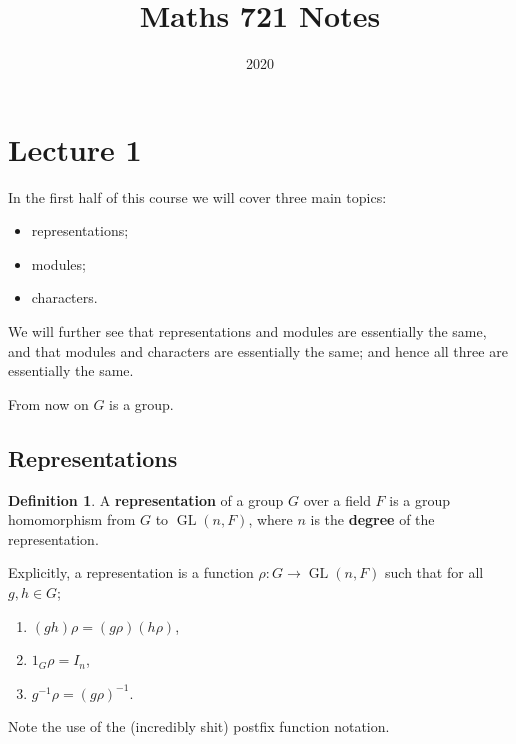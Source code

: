 \documentclass[11pt, notitlepage]{article}
\title{Maths 721 Notes}
\date{2020}
\numberwithin{equation}{section}
\theoremstyle{plain}
\theoremstyle{definition}
\newtheorem{definition}[theorem]{Definition}
\DeclareMathOperator{\GL}{GL}
\begin{document}
\maketitle
\tableofcontents
\vspace{5mm}



\pagebreak

\section{Lecture 1}


In the first half of this course we will cover three main topics:
\begin{itemize}
    \item representations;
    \item modules;
    \item characters.
\end{itemize}
We will further see that representations and modules are essentially the same, and that modules and characters are essentially the same; and hence all three are essentially the same.

From now on $G$ is a group.



\subsection{Representations}


\begin{definition}
A \textbf{representation} of a group $G$ over a field $F$ is a group homomorphism from $G$ to $\GL(n,F)$, where $n$ is the \textbf{degree} of the representation. 
\end{definition}

Explicitly, a representation is a function $\rho : G \to \GL(n,F)$ such that for all $g,h \in G$;
\begin{enumerate}[label=(\roman*)]
    \item $(gh)\rho = (g\rho)(h\rho)$,
    \item $1_G\rho = I_n$,
    \item $g^{-1}\rho = (g\rho)^{-1}$.
\end{enumerate}
Note the use of the (incredibly shit) postfix function notation.
\end{document}
